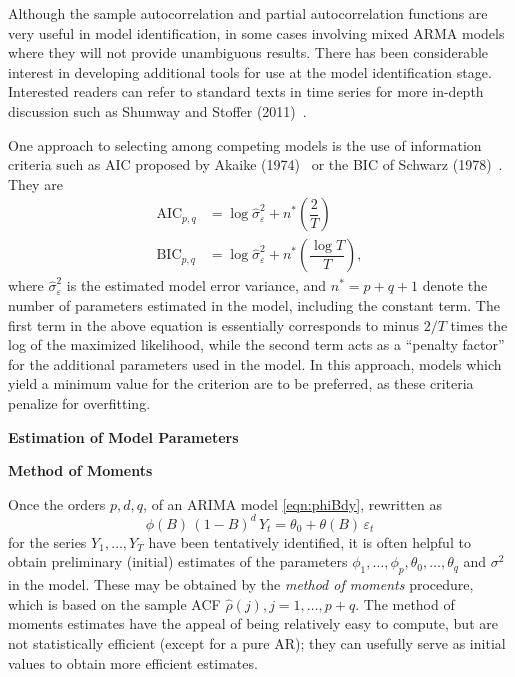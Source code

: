 Although the sample autocorrelation and partial autocorrelation functions are very useful in model identification, in some cases involving mixed ARMA models where they will not provide unambiguous results. There has been considerable interest in developing additional tools for use at the model identification stage. Interested readers can refer to standard texts in time series for more in-depth discussion such as Shumway and Stoffer (2011)~\cite{shumway2011arima}.


One approach to selecting among competing models is the use of information criteria such as AIC proposed by Akaike (1974)~\cite{akaike74} or the BIC of Schwarz (1978)~\cite{sch78}. They are
	\begin{equation} \label{eqn:aicbic}
	\begin{split}
	\text{AIC}_{p,q}&= \log \hat{\sigma}_\varepsilon^2 + n^* \left( \dfrac{2}{T} \right) \\
	\text{BIC}_{p,q}&=\log\hat{\sigma}_\varepsilon^2 + n^* \left( \dfrac{\log T}{T} \right),
	\end{split}
	\end{equation}
where $\hat{\sigma}_\varepsilon^2$ is the estimated model error variance, and $n^*= p + q + 1$ denote the number of parameters estimated in the model, including the constant term. The first term in the above equation is essentially corresponds to minus $2/T$ times the log of the maximized likelihood, while the second term acts as a ``penalty factor'' for the additional parameters used in the model. In this approach, models which yield a minimum value for the criterion are to be preferred, as these criteria penalize for overfitting. \twomedskip


{\noindent\bfseries\large Estimation of Model Parameters} \twomedskip

\noindent \textbf{Method of Moments} \twomedskip


Once the orders $p,d,q$, of an ARIMA model \eqref{eqn:phiBdy}, rewritten as 
	\begin{equation} \label{eqn:phiB}
	\phi(B) \, (1 - B)^d \, Y_t = \theta_0 + \theta(B) \, \varepsilon_t
	\end{equation}
for the series $Y_1, \ldots, Y_T$ have been tentatively identified, it is often helpful to obtain preliminary (initial) estimates of the parameters $\phi_1, \ldots, \phi_p, \theta_0, \ldots, \theta_q$ and $\sigma^2$ in the model. These may be obtained by the \textit{method of moments} procedure, which is based on the sample ACF $\hat{\rho}(j), j= 1, \ldots,  p+q$. The method of moments estimates have the appeal of being relatively easy to compute, but are not statistically efficient (except for a pure AR); they can usefully serve as initial values to obtain more efficient estimates.



